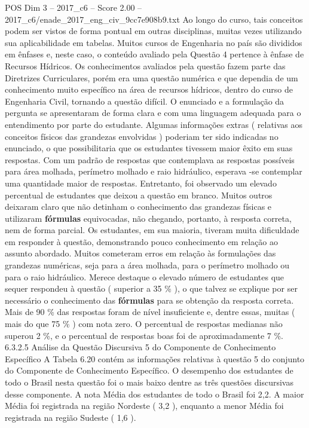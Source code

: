 \begin{textsample}{POS Dim 3 – 2017\_c6 – Score 2.00 – 2017\_c6/enade\_2017\_eng\_civ\_9cc7e908b9.txt}
Ao longo do curso, tais conceitos podem ser vistos de forma pontual em outras disciplinas, muitas vezes utilizando sua aplicabilidade em tabelas.
Muitos cursos de Engenharia no país são divididos em ênfases e, neste caso, o conteúdo avaliado pela Questão 4 pertence à ênfase de Recursos Hídricos.
Os conhecimentos avaliados pela questão fazem parte das Diretrizes Curriculares, porém era uma questão numérica e que dependia de um conhecimento muito específico na área de recursos hídricos, dentro do curso de Engenharia Civil, tornando a questão difícil.
O enunciado e a formulação da pergunta se apresentaram de forma clara e com uma linguagem adequada para o entendimento por parte do estudante.
Algumas informações extras ( relativas aos conceitos físicos das grandezas envolvidas ) poderiam ter sido indicadas no enunciado, o que possibilitaria que os estudantes tivessem maior êxito em suas respostas.
Com um padrão de respostas que contemplava as respostas possíveis para área molhada, perímetro molhado e raio hidráulico, esperava -se contemplar uma quantidade maior de respostas.
Entretanto, foi observado um elevado percentual de estudantes que deixou a questão em branco.
Muitos outros deixaram claro que não detinham o conhecimento das grandezas físicas e utilizaram \textbf{fórmulas} equivocadas, não chegando, portanto, à resposta correta, nem de forma parcial.
Os estudantes, em sua maioria, tiveram muita dificuldade em responder à questão, demonstrando pouco conhecimento em relação ao assunto abordado.
Muitos cometeram erros em relação às formulações das grandezas numéricas, seja para a área molhada, para o perímetro molhado ou para o raio hidráulico.
Merece destaque o elevado número de estudantes que sequer respondeu à questão ( superior a 35 \% ), o que talvez se explique por ser necessário o conhecimento das \textbf{fórmulas} para se obtenção da resposta correta.
Mais de 90 \% das respostas foram de nível insuficiente e, dentre essas, muitas ( mais do que 75 \% ) com nota zero.
O percentual de respostas medianas não superou 2 \%, e o percentual de respostas boas foi de aproximadamente 7 \%. 6.3.2.5 Análise da Questão Discursiva 5 do Componente de Conhecimento Específico A Tabela 6.20 contém as informações relativas à questão 5 do conjunto do Componente de Conhecimento Específico.
O desempenho dos estudantes de todo o Brasil nesta questão foi o mais baixo dentre as três questões discursivas desse componente.
A nota Média dos estudantes de todo o Brasil foi 2,2.
A maior Média foi registrada na região Nordeste ( 3,2 ), enquanto a menor Média foi registrada na região Sudeste ( 1,6 ).

\end{textsample}
